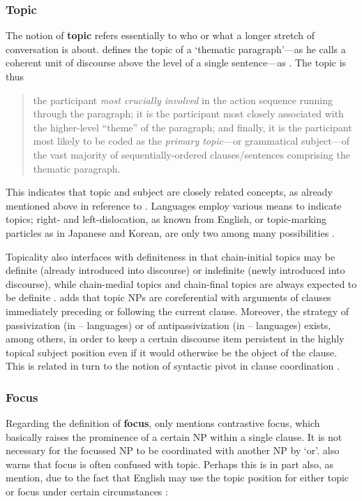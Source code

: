 \subsubsection{Topic}

The notion of \textbf{topic} refers essentially to who or what a longer stretch
of conversation is about. \citet{givon1983} defines the topic of a `thematic
paragraph'---as he calls a coherent unit of discourse above the level of a
single sentence---as . The topic is thus

\blockcquote[8]{givon1983}{the participant \emph{most crucially involved} in
the action sequence running through the paragraph; it is the participant most
closely associated with the higher-level \enquote{theme} of the paragraph; and
finally, it is the participant most likely to be coded as the \emph{primary
topic}---or grammatical subject---of the vast majority of sequentially-ordered
clauses/sentences comprising the thematic paragraph.}

This indicates that topic and subject are closely related concepts, as already
mentioned above in reference to \citet{comrie1989}. Languages employ various
means to indicate topics; right- and left-dislocation, as known from English,
or topic-marking particles as in Japanese and Korean, are only two among many
possibilities \citep[174]{dixon2010a}.

Topicality also interfaces with definiteness in that chain-initial topics may
be definite (already introduced into discourse) or indefinite (newly introduced
into discourse), while chain-medial topics and chain-final topics are always
expected to be definite \citep[10]{givon1983}. \citet[171]{dixon2010a} adds that
topic NPs are coreferential with arguments of clauses immediately preceding or
following the current clause. Moreover, the strategy of passivization (in
\Nom{}--\Acc{} languages) or of antipassivization (in \Erg{}--\Abs{} languages)
exists, among others, in order to keep a certain discourse item persistent in
the highly topical subject position even if it would otherwise be the object of
the clause. This is related in turn to the notion of syntactic pivot in clause
coordination \citep[172]{dixon2010a}.

\subsubsection{Focus}

Regarding the definition of \textbf{focus}, \citet[174]{dixon2010a} only
mentions contrastive focus, which basically raises the prominence of a certain
NP within a single clause. It is not necessary for the focussed NP to be
coordinated with another NP by `or'. \citet{dixon2010a} also warns that focus
is often confused with topic. Perhaps this is in part also, as
\citet{bresnan2016} mention, due to the fact that English may use the topic
position for either topic or focus under certain circumstances 
\parencite[98]{bresnan2016}:

